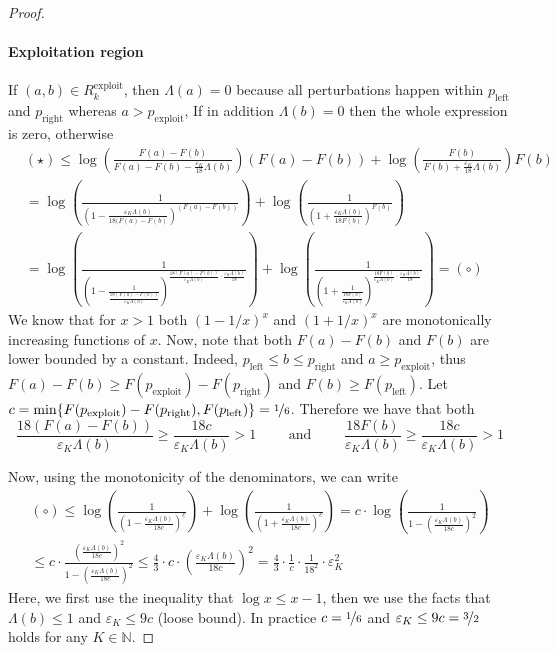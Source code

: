 \documentclass[final,12pt]{colt2025}
\newcommand{\e}{\varepsilon}
\newcommand{\lrb}[1]{\left(#1\right)}
\newcommand{\nb}{b}
\newcommand{\ns}{a}
\begin{document}
\begin{proof}
\paragraph{Exploitation region}
If $(\ns,\nb) \in R_k^\text{exploit}$, then $\Lambda(\ns) = 0$ because all perturbations happen within $p_\text{left}$ and $p_\text{right}$ whereas $\ns > p_\text{exploit}$,
If in addition $\Lambda(\nb) = 0$ then the whole expression is zero, otherwise
\begin{align*}
&
    (\star) \le
    \log \lrb{ \frac{F(\ns) - F(\nb)}{F(\ns) - F(\nb) - \frac{\e_K}{18}\Lambda(\nb)} } (F(\ns) - F(\nb))
    + \log \lrb{
        \frac{F(\nb)}{F(\nb) + \frac{\e_K}{18} \Lambda(\nb)}
    } F(\nb)
\\ &
    = \log\lrb{ \frac{1}{\lrb{ 1-\frac{\e_K\Lambda(\nb)}{18(F(\ns) - F(\nb)}}^{(F(\ns)-F(\nb))} }}
    + \log\lrb{ \frac{1}{\lrb{ 1+\frac{\e_K\Lambda(\nb)}{18F(\nb)}}^{F(\nb)} }}
\\ &
    = \log\lrb{
        \frac{1}{
            \lrb{
                1 - \frac{1}{\frac{18(F(\ns) - F(\nb))}{\e_K\Lambda(\nb)}}    
            }^{
                \frac{18(F(\ns)-F(\nb))}{\e_K \Lambda(\nb)}
                \cdot \frac{\e_K \Lambda(\nb)}{18}
            }
        }
    }
    + \log\lrb{ \frac{1}{\lrb{ 1+\frac{1}{\frac{18F(\nb)}{\e_K\Lambda(\nb)}}}^{\frac{18F(\nb)}{\e_K \Lambda(\nb)} \cdot \frac{\e_K \Lambda(\nb)}{18}} }}
    = (\circ)
\end{align*}
We know that for $x>1$ both $(1-1/x)^x$ and $(1+1/x)^x$ are monotonically increasing functions of $x$. Now, note that both $F(\ns) - F(\nb)$ and $F(\nb)$ are lower bounded by a constant. Indeed, $p_\text{left} \leq \nb \leq p_\text{right}$ and $\ns\geq p_\text{exploit}$, thus $F(\ns) - F(\nb)\geq F(p_\text{exploit}) - F(p_\text{right})$ and $F(\nb)\geq F(p_\text{left})$. Let $c = \min\{F(p_\text{exploit}) - F(p_\text{right}), F(p_\text{left})\} = \nicefrac{1}{6}$.
Therefore we have that both
$$
    \frac{18(F(\ns) - F(\nb))}{\e_K\Lambda(\nb)} \ge \frac{18c}{\e_K\Lambda(\nb)} > 1
    \qquad
    \text{ and }
    \qquad
    \frac{18F(\nb)}{\e_K\Lambda(\nb)} \ge \frac{18c}{\e_K\Lambda(\nb)} > 1
$$

Now, using the monotonicity of the denominators, we can write
\begin{multline*}
    (\circ) \le
    \log \lrb{ \frac{1}{\lrb{ 1 - \frac{\e_K\Lambda(\nb)}{18c}}^c} }
    + \log\lrb{ \frac{1}{\lrb{ 1 + \frac{\e_K\Lambda(\nb)}{18c} }^c }}
    = c\cdot\log\lrb{\frac{1}{1-\lrb{ \frac{\e_K\Lambda(\nb)}{18c}}^2}}
\\
    \leq c\cdot\frac{\lrb{ \frac{\e_K\Lambda(\nb)}{18c}}^2}{1-\lrb{ \frac{\e_K\Lambda(\nb)}{18c}}^2}
    \leq \frac{4}{3}\cdot c\cdot\lrb{ \frac{\e_K\Lambda(\nb)}{18c}}^2
    = \frac{4}{3}\cdot\frac{1}{c}\cdot\frac{1}{18^2}\cdot\e_K^2
\end{multline*}
Here, we first use the inequality that $\log x \leq x - 1$, then we use the facts that $\Lambda(\nb) \leq 1$ and $\e_K \leq 9c$ (loose bound). In practice $c = \nicefrac{1}{6}$ and $\e_K \le 9c = \nicefrac{3}{2}$ holds for any $K \in \mathbb{N}$.


\end{proof}
\end{document}
